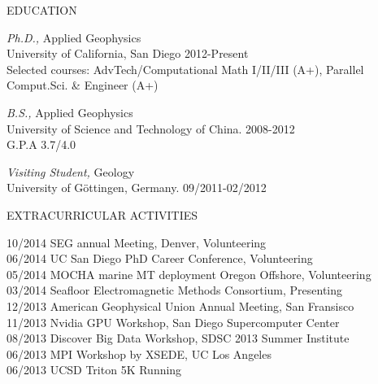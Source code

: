 \documentclass{resume} %
\begin{document}
\begin{rSection}{EDUCATION}

{\sl Ph.D.,} Applied Geophysics\\
University of California, San Diego  \hfill 2012-Present \\
Selected courses: AdvTech/Computational Math I/II/III (A+), Parallel Comput.Sci. \& Engineer (A+)
 
 {\sl B.S.,} Applied Geophysics\\
University of Science and Technology of China. \hfill  2008-2012\\
G.P.A   3.7/4.0

 {\sl Visiting Student,} Geology\\
University of G\"{o}ttingen, Germany.    \hfill   09/2011-02/2012\\

\end{rSection}


\begin{rSection}{EXTRACURRICULAR  ACTIVITIES}

10/2014 \quad SEG annual Meeting, Denver, Volunteering\\
06/2014 \quad UC San Diego PhD Career Conference, Volunteering\\
05/2014 \quad MOCHA marine MT deployment  Oregon Offshore, Volunteering\\	
03/2014 \quad Seafloor Electromagnetic Methods Consortium, Presenting \\
12/2013 \quad American Geophysical Union Annual Meeting, San Fransisco\\
11/2013 \quad Nvidia GPU Workshop, San Diego Supercomputer Center\\
08/2013 \quad Discover Big Data Workshop, SDSC 2013 Summer Institute\\
06/2013 \quad MPI Workshop by  XSEDE, UC Los Angeles\\
06/2013 \quad UCSD Triton 5K Running 

\end{rSection}
\end{document}
